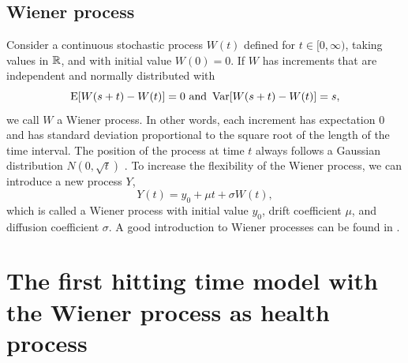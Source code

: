 \subsection{Wiener process}\label{subsec:wiener}
Consider a continuous stochastic process $W(t)$ defined for $t\in[0,\infty)$, taking values in $\mathbb{R}$, and with initial value $W(0)=0$. If $W$ has increments that are independent and normally distributed with
\begin{equation*}
    \operatorname{E}[W(s+t)-W(t)]=0\text{   and   }\operatorname{Var}[W(s+t)-W(t)]=s,
\end{equation*}
we call $W$ a Wiener process.
In other words, each increment has expectation 0 and has standard deviation proportional to the square root of the length of the time interval.
The position of the process at time $t$ always follows a Gaussian distribution $N(0, \sqrt{t})$ \citep{ABG}.
To increase the flexibility of the Wiener process, we can introduce a new process $Y$,
\begin{equation}\label{wiener}
    Y(t)=y_0+\mu t+\sigma W(t),
\end{equation}
which is called a Wiener process with initial value $y_0$, drift coefficient $\mu$, and diffusion coefficient $\sigma$.
A good introduction to Wiener processes can be found in \citet{cox1965}.

\section{The first hitting time model with the Wiener process as health process}
